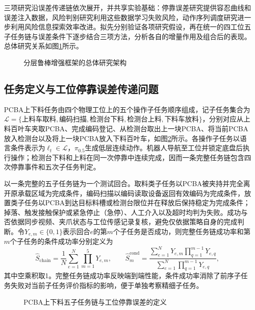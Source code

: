 三项研究沿误差传递链依次展开，并共享实验基础：停靠误差研究提供容忍曲线和误差注入数据，风险判别研究利用这些数据学习失败风险，动作序列调度研究进一步利用风险信息探索效率改进。拟先分别验证各项研究假设，再在统一的四工位五子任务链与误差条件下逐步结合三项方法，分析各自的增量作用及组合后的表现。总体研究关系如图\ref{fig:research-architecture}所示。

\begin{figure}[htbp]
  \centering
  \makebox[\textwidth][c]{}
  \caption{分层鲁棒增强框架的总体研究架构}
  \label{fig:research-architecture}
\end{figure}

\subsection{任务定义与工位停靠误差传递问题}
\label{subsec:task-definition}

PCBA上下料任务由四个物理工位上的五个操作子任务顺序组成，记子任务集合为\(\mathcal L=\{\text{上料车取料},\text{编码扫描},\text{检测台下料},\text{检测台上料},\text{下料车放料}\}\)，分别对应从上料百叶车夹取PCBA、完成编码登记、从检测台取出上一块PCBA、将当前PCBA放入检测台以及将上一块PCBA放入下料百叶车，如图\ref{fig:pcba-station-flow}所示。各操作子任务以语言条件表示为\(\ell_t\in\mathcal L\)，\(\pi_{0.5}\)生成低层连续动作。机器人导航至工位并锁定底盘后执行操作；检测台下料和上料在同一次停靠中连续完成，因而一条完整任务链包含四次停靠事件和五次子任务判定。

以一条完整的五子任务链为一个测试回合。取料类子任务以PCBA被夹持并完全离开原承载区域为完成条件，编码扫描以编码读取设备返回有效编码为完成条件，放置类子任务以PCBA到达目标料槽或检测台限位并在释放后保持稳定为完成条件；掉落、触发接触保护或紧急停止（急停）、人工介入以及超时均判为失败。成功与否依据同步视频、夹爪状态与工位传感记录复核，避免仅依据策略自身的完成判断。令\(Y_{e,m}\in\{0,1\}\)表示回合\(e\)的第\(m\)个子任务是否成功，则完整任务链成功率和第\(m\)个子任务的条件成功率分别定义为
\begin{equation}
  \widehat S_{\mathrm{chain}}
  =
  \frac{1}{N}\sum_{e=1}^{N}\prod_{m=1}^{5}Y_{e,m},
  \qquad
  \widehat S_m^{\mathrm{cond}}
  =
  \frac{
    \sum_{e=1}^{N}Y_{e,m}\prod_{q=1}^{m-1}Y_{e,q}
  }{
    \sum_{e=1}^{N}\prod_{q=1}^{m-1}Y_{e,q}
  },
  \label{eq:task-success-metrics}
\end{equation}
其中空乘积取1。完整任务链成功率反映端到端性能，条件成功率消除了前序子任务失败对当前子任务评价指标的影响，便于单独考察精细子任务。

\begin{figure}[htbp]
  \centering
  
  \caption{PCBA上下料五子任务链与工位停靠误差的定义}
  \label{fig:pcba-station-flow}
\end{figure}

